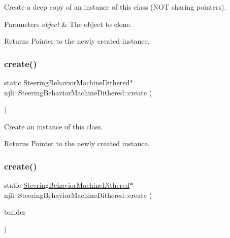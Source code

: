 Create a deep copy of an instance of this class (N\+OT sharing pointers).


\begin{DoxyParams}{Parameters}
{\em object} & The object to clone.\\
\hline
\end{DoxyParams}
\begin{DoxyReturn}{Returns}
Pointer to the newly created instance. 
\end{DoxyReturn}
\mbox{\label{classnjli_1_1_steering_behavior_machine_dithered_a114f4f4f9fd40f9470450091d7b05a08}} 
\subsubsection{\texorpdfstring{create()}{create()}\hspace{0.1cm}{\footnotesize\ttfamily [1/2]}}
{\footnotesize\ttfamily static \mbox{\hyperlink{classnjli_1_1_steering_behavior_machine_dithered}{Steering\+Behavior\+Machine\+Dithered}}$\ast$ njli\+::\+Steering\+Behavior\+Machine\+Dithered\+::create (\begin{DoxyParamCaption}{ }\end{DoxyParamCaption})\hspace{0.3cm}{\ttfamily [static]}}

Create an instance of this class.

\begin{DoxyReturn}{Returns}
Pointer to the newly created instance. 
\end{DoxyReturn}
\mbox{\label{classnjli_1_1_steering_behavior_machine_dithered_a033a7447b22988087a4b6c97f9421d6f}} 
\subsubsection{\texorpdfstring{create()}{create()}\hspace{0.1cm}{\footnotesize\ttfamily [2/2]}}
{\footnotesize\ttfamily static \mbox{\hyperlink{classnjli_1_1_steering_behavior_machine_dithered}{Steering\+Behavior\+Machine\+Dithered}}$\ast$ njli\+::\+Steering\+Behavior\+Machine\+Dithered\+::create (\begin{DoxyParamCaption}\item[{const \mbox{\hyperlink{classnjli_1_1_steering_behavior_machine_dithered_builder}{Steering\+Behavior\+Machine\+Dithered\+Builder}} \&}]{builder }\end{DoxyParamCaption})\hspace{0.3cm}{\ttfamily [static]}}

